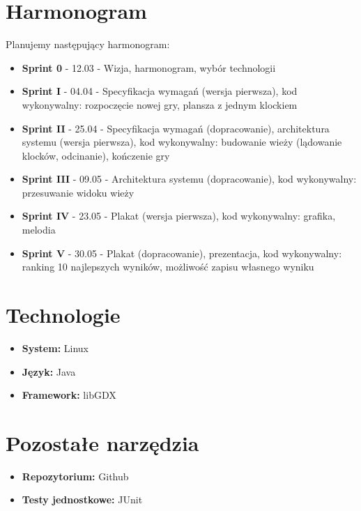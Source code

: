 \documentclass{article}
\begin{document}
\section{Harmonogram}
Planujemy następujący harmonogram:
\begin{itemize}
\item\textbf{Sprint 0} - 12.03 - Wizja, harmonogram, wybór technologii
\item\textbf{Sprint I} - 04.04 - Specyfikacja wymagań (wersja pierwsza), kod wykonywalny: rozpoczęcie nowej gry, plansza z jednym klockiem
\item\textbf{Sprint II} - 25.04 - Specyfikacja wymagań (dopracowanie), architektura systemu (wersja pierwsza), kod wykonywalny: budowanie wieży (lądowanie klocków, odcinanie), kończenie gry
\item\textbf{Sprint III} - 09.05 - Architektura systemu (dopracowanie), kod wykonywalny: przesuwanie widoku wieży
\item\textbf{Sprint IV} - 23.05 - Plakat (wersja pierwsza), kod wykonywalny: grafika, melodia
\item\textbf{Sprint V} - 30.05 - Plakat (dopracowanie), prezentacja, kod wykonywalny: ranking 10 najlepszych wyników, możliwość zapisu własnego wyniku
\end{itemize}

\section{Technologie}
\begin{itemize}
\item\textbf{System:} Linux
\item\textbf{Język:} Java
\item\textbf{Framework:} libGDX
\end{itemize}


\section{Pozostałe narzędzia}
\begin{itemize}
\item\textbf{Repozytorium:} Github
\item\textbf{Testy jednostkowe:} JUnit
\end{itemize}
\end{document}
